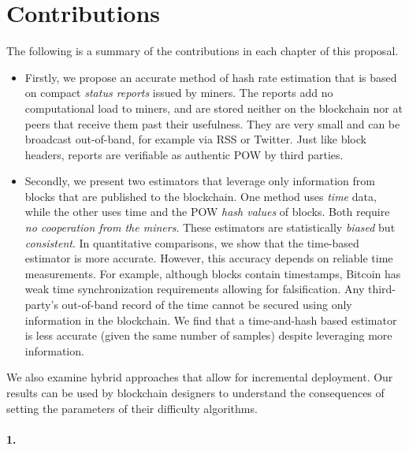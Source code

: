 \section*{Contributions}
The following is a summary of the contributions in each chapter of this proposal. 
\begin{itemize}
\item Firstly, we propose an accurate method of hash rate estimation that is based
  on compact {\em status reports} issued by miners. The reports add no
  computational load to miners, and are stored neither on the
  blockchain nor at peers that receive them past their usefulness.   They are very small and  can be broadcast
  out-of-band, for example via RSS or Twitter. Just like block
  headers, reports are verifiable as authentic POW by third
  parties. 
  \item Secondly, we present two estimators that leverage only information from blocks that are published to the blockchain. One method uses {\em time} data, while the other uses time and the POW {\em hash values} of blocks. Both require {\em no cooperation from the miners}. These estimators are statistically \emph{biased} but \emph{consistent}. In quantitative comparisons, we show that the time-based estimator is more accurate. However, this accuracy depends on reliable time measurements. For example, although blocks contain timestamps, Bitcoin has weak time synchronization requirements allowing for falsification. Any third-party's out-of-band record of the time cannot be secured using  only information in the blockchain. We find that a time-and-hash based estimator is less accurate (given the same number of samples) despite leveraging more information.  
\end{itemize}
We also examine hybrid approaches that allow for incremental deployment. 
Our results can be used by blockchain designers to understand the consequences of setting the parameters of their difficulty algorithms. 

\paragraph*{1.}

